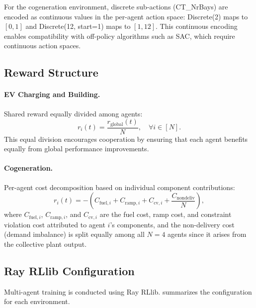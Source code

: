 For the cogeneration environment, discrete sub-actions (CT\_NrBays) are encoded as continuous values in the per-agent action space: Discrete(2) maps to $[0, 1]$ and Discrete(12, start=1) maps to $[1, 12]$. This continuous encoding enables compatibility with off-policy algorithms such as SAC, which require continuous action spaces.

\subsection{Reward Structure}
\label{sec:marl_reward}

\paragraph{EV Charging and Building.} Shared reward equally divided among agents:
\begin{equation}
    r_i(t) = \frac{r_{\text{global}}(t)}{N}, \quad \forall i \in [N].
    \label{eq:marl_shared_reward}
\end{equation}
This equal division encourages cooperation by ensuring that each agent benefits equally from global performance improvements.

\paragraph{Cogeneration.} Per-agent cost decomposition based on individual component contributions:
\begin{equation}
    r_i(t) = -\left(C_{\text{fuel},i} + C_{\text{ramp},i} + C_{\text{cv},i} + \frac{C_{\text{nondeliv}}}{N}\right),
    \label{eq:cogen_marl_reward}
\end{equation}
where $C_{\text{fuel},i}$, $C_{\text{ramp},i}$, and $C_{\text{cv},i}$ are the fuel cost, ramp cost, and constraint violation cost attributed to agent $i$'s components, and the non-delivery cost (demand imbalance) is split equally among all $N = 4$ agents since it arises from the collective plant output.

\subsection{Ray RLlib Configuration}
\label{sec:rllib_config}

Multi-agent training is conducted using Ray RLlib.  summarizes the configuration for each environment.

